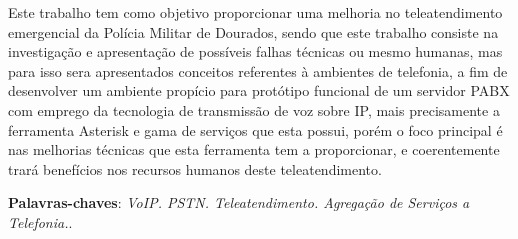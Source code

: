 \setlength{\absparsep}{18pt} %
\begin{resumo}

Este trabalho tem como objetivo proporcionar uma melhoria no teleatendimento emergencial da Polícia Militar de Dourados, sendo que este trabalho consiste na investigação e apresentação de possíveis falhas técnicas ou mesmo humanas, mas para isso sera apresentados conceitos referentes à ambientes de telefonia, a fim de desenvolver um ambiente propício para protótipo funcional de um servidor PABX com emprego da tecnologia de transmissão de voz sobre IP, mais precisamente a ferramenta Asterisk e gama de serviços que esta possui, porém o foco principal é nas melhorias técnicas que esta ferramenta tem a proporcionar, e coerentemente trará benefícios nos recursos humanos deste teleatendimento.

 \textbf{Palavras-chaves}: \textit{VoIP. PSTN. Teleatendimento. Agregação de Serviços a Telefonia.}.
\end{resumo}
